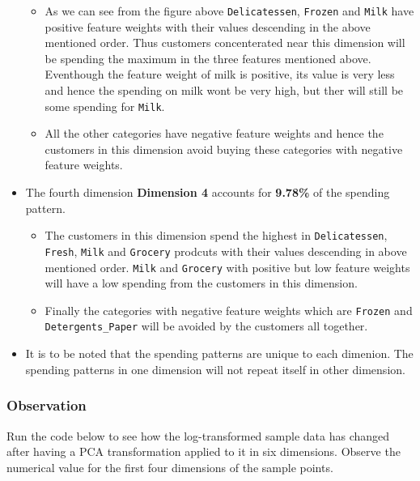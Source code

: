 \documentclass[11pt]{article}
\providecommand{\tightlist}{%
      \setlength{\itemsep}{0pt}\setlength{\parskip}{0pt}}
\begin{document}
\begin{itemize}
  \begin{itemize}
  \tightlist
  \item
    As we can see from the figure above \texttt{Delicatessen},
    \texttt{Frozen} and \texttt{Milk} have positive feature weights with
    their values descending in the above mentioned order. Thus customers
    concenterated near this dimension will be spending the maximum in
    the three features mentioned above. Eventhough the feature weight of
    milk is positive, its value is very less and hence the spending on
    milk wont be very high, but ther will still be some spending for
    \texttt{Milk}.
  \item
    All the other categories have negative feature weights and hence the
    customers in this dimension avoid buying these categories with
    negative feature weights.
  \end{itemize}
\item
  The fourth dimension \textbf{Dimension 4} accounts for \textbf{9.78\%}
  of the spending pattern.

  \begin{itemize}
  \tightlist
  \item
    The customers in this dimension spend the highest in
    \texttt{Delicatessen}, \texttt{Fresh}, \texttt{Milk} and
    \texttt{Grocery} prodcuts with their values descending in above
    mentioned order. \texttt{Milk} and \texttt{Grocery} with positive
    but low feature weights will have a low spending from the customers
    in this dimension.
  \item
    Finally the categories with negative feature weights which are
    \texttt{Frozen} and \texttt{Detergents\_Paper} will be avoided by
    the customers all together.
  \end{itemize}
\item
  It is to be noted that the spending patterns are unique to each
  dimenion. The spending patterns in one dimension will not repeat
  itself in other dimension.
\end{itemize}

    \subsubsection{Observation}\label{observation}

Run the code below to see how the log-transformed sample data has
changed after having a PCA transformation applied to it in six
dimensions. Observe the numerical value for the first four dimensions of
the sample points.
\end{document}
